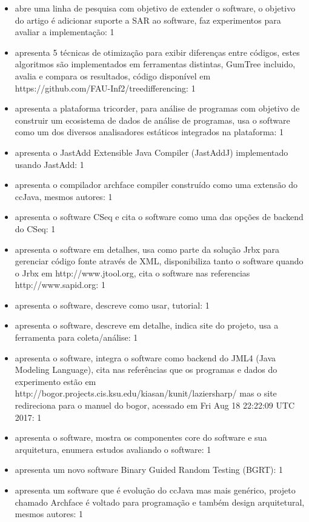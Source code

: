 \begin{itemize}
\item abre uma linha de pesquisa com objetivo de extender o software, o objetivo do artigo é adicionar suporte a SAR ao software, faz experimentos para avaliar a implementação: 1
\item apresenta 5 técnicas de otimização para exibir diferenças entre códigos, estes algoritmos são implementados em ferramentas distintas, GumTree incluido, avalia e compara os resultados, código disponível em https://github.com/FAU-Inf2/treedifferencing: 1
\item apresenta a plataforma tricorder, para análise de programas com objetivo de construir um ecosistema de dados de análise de programas, usa o software como um dos diversos analisadores estáticos integrados na plataforma: 1
\item apresenta o JastAdd Extensible Java Compiler (JastAddJ) implementado usando JastAdd: 1
\item apresenta o compilador archface compiler construído como uma extensão do ccJava, mesmos autores: 1
\item apresenta o software CSeq e cita o software como uma das opções de backend do CSeq: 1
\item apresenta o software em detalhes, usa como parte da solução Jrbx para gerenciar código fonte através de XML, disponibiliza tanto o software quando o Jrbx em http://www.jtool.org, cita o software nas referencias http://www.sapid.org: 1
\item apresenta o software, descreve como usar, tutorial: 1
\item apresenta o software, descreve em detalhe, indica site do projeto, usa a ferramenta para coleta/análise: 1
\item apresenta o software, integra o software como backend do JML4 (Java Modeling Language), cita nas referências que os programas e dados do experimento estão em http://bogor.projects.cis.ksu.edu/kiasan/kunit/laziersharp/ mas o site redireciona para o manuel do bogor, acessado em Fri Aug 18 22:22:09 UTC 2017: 1
\item apresenta o software, mostra os componentes core do software e sua arquitetura, enumera estudos avaliando o software: 1
\item apresenta um novo software Binary Guided Random Testing (BGRT): 1
\item apresenta um software que é evolução do ccJava mas mais genérico, projeto chamado Archface é voltado para programação e também design arquitetural, mesmos autores: 1

\end{itemize}
